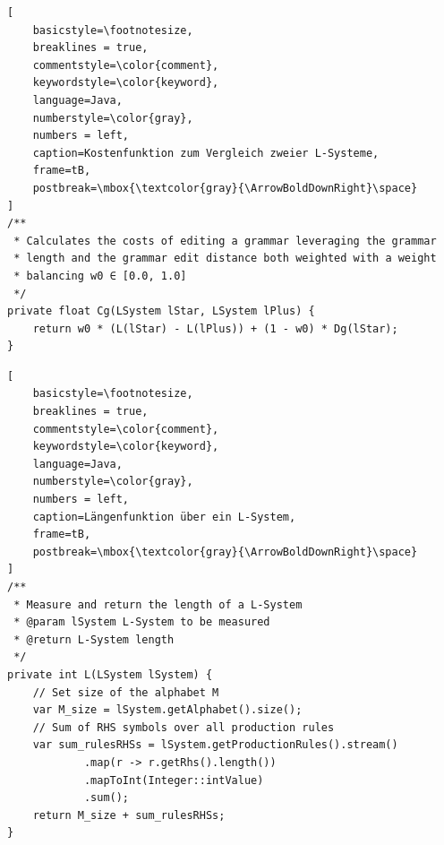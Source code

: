 \begin{lstlisting}[
    basicstyle=\footnotesize,
    breaklines = true,
    commentstyle=\color{comment},
    keywordstyle=\color{keyword},
    language=Java,
    numberstyle=\color{gray},
    numbers = left,
    caption=Kostenfunktion zum Vergleich zweier L-Systeme,
    frame=tB,
    postbreak=\mbox{\textcolor{gray}{\ArrowBoldDownRight}\space}
]
/**
 * Calculates the costs of editing a grammar leveraging the grammar
 * length and the grammar edit distance both weighted with a weight
 * balancing w0 ∈ [0.0, 1.0]
 */
private float Cg(LSystem lStar, LSystem lPlus) {
    return w0 * (L(lStar) - L(lPlus)) + (1 - w0) * Dg(lStar);
}
\end{lstlisting}
\begin{lstlisting}[
    basicstyle=\footnotesize,
    breaklines = true,
    commentstyle=\color{comment},
    keywordstyle=\color{keyword},
    language=Java,
    numberstyle=\color{gray},
    numbers = left,
    caption=Längenfunktion über ein L-System,
    frame=tB,
    postbreak=\mbox{\textcolor{gray}{\ArrowBoldDownRight}\space}
]
/**
 * Measure and return the length of a L-System
 * @param lSystem L-System to be measured
 * @return L-System length
 */
private int L(LSystem lSystem) {
    // Set size of the alphabet M
    var M_size = lSystem.getAlphabet().size();
    // Sum of RHS symbols over all production rules
    var sum_rulesRHSs = lSystem.getProductionRules().stream()
            .map(r -> r.getRhs().length())
            .mapToInt(Integer::intValue)
            .sum();
    return M_size + sum_rulesRHSs;
}
\end{lstlisting}

\newpage

